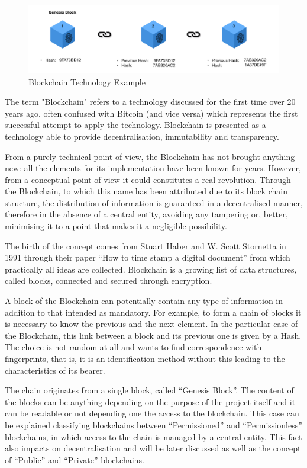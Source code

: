 \documentclass[preprint]{elsarticle}
\begin{document}
\begin{figure}[tph!]
	\centering
    \includegraphics[totalheight=3cm]{img/bck_chain}
    \caption{Blockchain Technology Example}
    \label{fig:blockchain}
\end{figure}

The term "Blockchain" refers to a technology discussed for the first time over 20 years ago, often confused with Bitcoin \cite{nakamoto2008bitcoin} (and vice versa) which represents the first successful attempt to apply the technology. Blockchain is presented as a technology able to provide decentralisation, immutability and transparency.

From a purely technical point of view, the Blockchain has not brought anything new: all the elements for its implementation have been known for years. However, from a conceptual point of view it could constitutes a real revolution. Through the Blockchain, to which this name has been attributed due to its block chain structure, the distribution of information is guaranteed in a decentralised manner, therefore in the absence of a central entity, avoiding any tampering or, better, minimising it to a point that makes it a negligible possibility.

The birth of the concept comes from Stuart Haber and W. Scott Stornetta in 1991 through their paper ``How to time stamp a digital document''\cite{haber1990time} from which practically all ideas are collected. Blockchain is a growing list of data structures, called blocks, connected and secured through encryption.

A block of the Blockchain can potentially contain any type of information in addition to that intended as mandatory. For example, to form a chain of blocks it is necessary to know the previous and the next element. In the particular case of the Blockchain, this link between a block and its previous one is given by a Hash. The choice is not random at all and wants to find correspondence with fingerprints, that is, it is an identification method without this leading to the characteristics of its bearer.

The chain originates from a single block, called ``Genesis Block''. The content of the blocks can be anything depending on the purpose of the project itself and it can be readable or not depending one the access to the blockchain. This case can be explained classifying blockchains between ``Permissioned'' and ``Permissionless'' blockchains, in which access to the chain is managed by a central entity. This fact also impacts on decentralisation and will be later discussed as well as the concept of ``Public'' and ``Private'' blockchains. 
\end{document}
